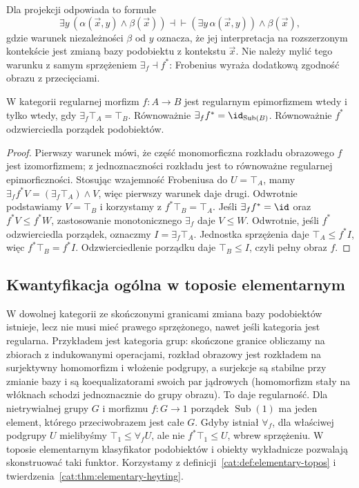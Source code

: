 Dla projekcji odpowiada to formule
\[
 \exists y\,(\alpha(\vec x,y)\wedge\beta(\vec x))
 \dashv\vdash
 (\exists y\,\alpha(\vec x,y))\wedge\beta(\vec x),
\]
gdzie warunek niezależności $\beta$ od $y$ oznacza, że jej interpretacja na rozszerzonym kontekście jest zmianą bazy podobiektu z kontekstu $\vec x$. Nie należy mylić tego warunku z samym sprzężeniem $\exists_f\dashv f^*$: Frobenius wyraża dodatkową zgodność obrazu z przecięciami.

\begin{wniosek}\label{cat:cor:cl-regular-epi-subobjects}
W kategorii regularnej morfizm $f:A\to B$ jest regularnym epimorfizmem wtedy i tylko wtedy, gdy $\exists_f\top_A=\top_B$. Równoważnie $\exists_f f^*=\id_{\operatorname{Sub}(B)}$. Równoważnie $f^*$ odzwierciedla porządek podobiektów.
\end{wniosek}
\begin{proof}
Pierwszy warunek mówi, że część monomorficzna rozkładu obrazowego $f$ jest izomorfizmem; z jednoznaczności rozkładu jest to równoważne regularnej epimorficzności. Stosując wzajemność Frobeniusa do $U=\top_A$, mamy $\exists_f f^*V=(\exists_f\top_A)\wedge V$, więc pierwszy warunek daje drugi. Odwrotnie podstawiamy $V=\top_B$ i korzystamy z $f^*\top_B=\top_A$. Jeśli $\exists_f f^*=\id$ oraz $f^*V\leq f^*W$, zastosowanie monotonicznego $\exists_f$ daje $V\leq W$. Odwrotnie, jeśli $f^*$ odzwierciedla porządek, oznaczmy $I=\exists_f\top_A$. Jednostka sprzężenia daje $\top_A\leq f^*I$, więc $f^*\top_B=f^*I$. Odzwierciedlenie porządku daje $\top_B\leq I$, czyli pełny obraz $f$.
\end{proof}

\subsection{Kwantyfikacja ogólna w toposie elementarnym}

W dowolnej kategorii ze skończonymi granicami zmiana bazy podobiektów istnieje, lecz nie musi mieć prawego sprzężonego, nawet jeśli kategoria jest regularna. Przykładem jest kategoria grup: skończone granice obliczamy na zbiorach z indukowanymi operacjami, rozkład obrazowy jest rozkładem na surjektywny homomorfizm i włożenie podgrupy, a surjekcje są stabilne przy zmianie bazy i są koequalizatorami swoich par jądrowych (homomorfizm stały na włóknach schodzi jednoznacznie do grupy obrazu). To daje regularność. Dla nietrywialnej grupy $G$ i morfizmu $f:G\to1$ porządek $\operatorname{Sub}(1)$ ma jeden element, którego przeciwobrazem jest całe $G$. Gdyby istniał $\forall_f$, dla właściwej podgrupy $U$ mielibyśmy $\top_1\leq\forall_f U$, ale nie $f^*\top_1\leq U$, wbrew sprzężeniu. W toposie elementarnym klasyfikator podobiektów i obiekty wykładnicze pozwalają skonstruować taki funktor. Korzystamy z definicji~\ref{cat:def:elementary-topos} i twierdzenia~\ref{cat:thm:elementary-heyting}.


